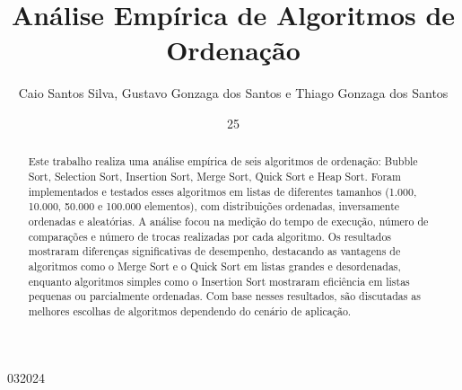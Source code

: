 \documentclass[tcc2]{uftex}
\begin{document}
  \title{Análise Empírica de Algoritmos de Ordenação}
  \author{Caio Santos Silva, Gustavo Gonzaga dos Santos e Thiago Gonzaga dos Santos}{}


  \date{25}{03}{2024}
  
 \maketitle


  \begin{abstract}
  Este trabalho realiza uma análise empírica de seis algoritmos de ordenação: Bubble Sort, Selection Sort, Insertion Sort, Merge Sort, Quick Sort e Heap Sort. Foram implementados e testados esses algoritmos em listas de diferentes tamanhos (1.000, 10.000, 50.000 e 100.000 elementos), com distribuições ordenadas, inversamente ordenadas e aleatórias. A análise focou na medição do tempo de execução, número de comparações e número de trocas realizadas por cada algoritmo. Os resultados mostraram diferenças significativas de desempenho, destacando as vantagens de algoritmos como o Merge Sort e o Quick Sort em listas grandes e desordenadas, enquanto algoritmos simples como o Insertion Sort mostraram eficiência em listas pequenas ou parcialmente ordenadas. Com base nesses resultados, são discutadas as melhores escolhas de algoritmos dependendo do cenário de aplicação.
  \end{abstract}
\end{document}
